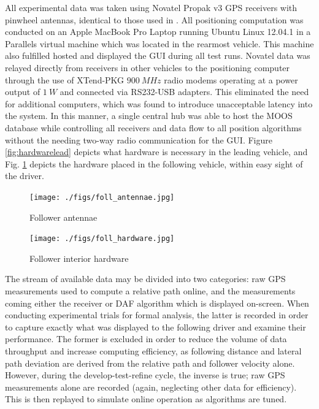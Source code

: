 \documentclass[12pt]{report}
\begin{document}
All experimental data was taken using Novatel Propak v3 GPS receivers with pinwheel antennas, identical to those used in \cite{scottthesis}. All positioning computation was conducted on an Apple MacBook Pro Laptop running Ubuntu Linux 12.04.1 in a Parallels virtual machine which was located in the rearmost vehicle. This machine also fulfilled hosted and displayed the GUI during all test runs. Novatel data was relayed directly from receivers in other vehicles to the positioning computer through the use of XTend-PKG $900~MHz$ radio modems operating at a power output of $1~W$ and connected via RS232-USB adapters. This eliminated the need for additional computers, which was found to introduce unacceptable latency into the system. In this manner, a single central hub was able to host the MOOS database while controlling all receivers and data flow to all position algorithms without the needing two-way radio communication for the GUI. Figure \ref{fig:hardwarelead} depicts what hardware is necessary in the leading vehicle, and Fig. \ref{fig:hardwarefoll} depicts the hardware placed in the following vehicle, within easy sight of the driver.

\begin{figure}[ht]
    \begin{minipage}[b]{0.45\linewidth} \centering \label{fig:antennaefoll}
        \texttt{[image: ./figs/foll\_antennae.jpg]} 
        \caption{Follower antennae}
    \end{minipage}
    \hspace{0.5cm}
    \begin{minipage}[b]{0.45\linewidth} \centering \label{fig:hardwarefoll}
        \texttt{[image: ./figs/foll\_hardware.jpg]}
        \caption{Follower interior hardware}
    \end{minipage}
\end{figure}


The stream of available data may be divided into two categories: raw GPS measurements used to compute a relative path online, and the measurements coming either the receiver or DAF algorithm which is displayed on-screen. When conducting experimental trials for formal analysis, the latter is recorded in order to capture exactly what was displayed to the following driver and examine their performance. The former is excluded in order to reduce the volume of data throughput and increase computing efficiency, as following distance and lateral path deviation are derived from the relative path and follower velocity alone. However, during the develop-test-refine cycle, the inverse is true; raw GPS measurements alone are recorded (again, neglecting other data for efficiency). This is then replayed to simulate online operation as algorithms are tuned.
\end{document}
